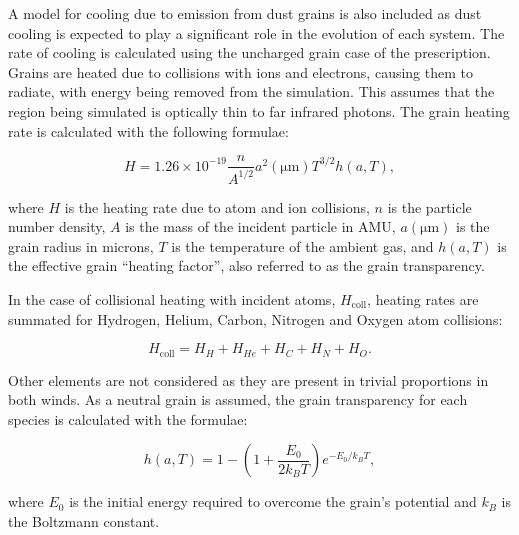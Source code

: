\documentclass[fleqn,usenatbib]{mnras}
\begin{document}
A model for cooling due to emission from dust grains is also included as dust cooling is expected to play a significant role in the evolution of each system.
The rate of cooling is calculated using the uncharged grain case of the \cite{dwek_infrared_1981} prescription.
Grains are heated due to collisions with ions and electrons, causing them to radiate, with energy being removed from the simulation.
This assumes that the region being simulated is optically thin to far infrared photons.
The grain heating rate is calculated with the following formulae:

\begin{equation}
    H = 1.26 \times 10^{-19} \frac{n}{A^{1/2}} a^2(\si{\micro\metre}) T^{3/2} h(a,T) , 
\end{equation}

\noindent
where $H$ is the heating rate due to atom and ion collisions, 
$n$ is the particle number density,
$A$ is the mass of the incident particle in AMU,
$a(\si{\micro\metre})$ is the grain radius in microns,
$T$ is the temperature of the ambient gas,
and $h(a,T)$ is the effective grain ``heating factor'', also referred to as the grain transparency. 

In the case of collisional heating with incident atoms, $H_\text{coll}$, heating rates are summated for Hydrogen, Helium, Carbon, Nitrogen and Oxygen atom collisions:

\begin{equation}
  H_\text{coll} = H_H + H_{He} + H_{C} + H_{N} + H_{O} .
\end{equation}

\noindent
Other elements are not considered as they are present in trivial proportions in both winds.
As a neutral grain is assumed, the grain transparency for each species is calculated with the formulae:

\begin{equation}
  h(a,T) = 1 - \left( 1 + \frac{E_0}{2 k_B T} \right) e^{- E_0 / k_B T} ,
\end{equation}

\noindent
where $E_0$ is the initial energy required to overcome the grain's potential and $k_B$ is the Boltzmann constant.
\end{document}
